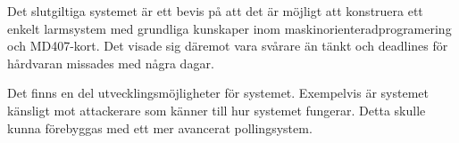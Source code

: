 \documentclass[a4paper]{article}
\begin{document}
Det slutgiltiga systemet är ett bevis på att det är möjligt att konstruera ett enkelt larmsystem med grundliga kunskaper inom maskinorienteradprogramering och MD407-kort. 
Det visade sig däremot vara svårare än tänkt och deadlines för hårdvaran missades med några dagar. 

Det finns en del utvecklingsmöjligheter för systemet. %
Exempelvis är systemet känsligt mot attackerare som känner till hur systemet fungerar. 
Detta skulle kunna förebyggas med ett mer avancerat pollingsystem.




\end{document}
